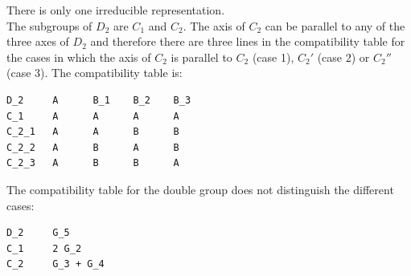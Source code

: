 \documentclass[12pt,a4paper]{article}
\begin{document}
There is only one irreducible representation. \\
The subgroups of $D_2$ are $C_1$ and $C_2$. The axis of $C_2$ can be parallel to
any of the three axes of $D_2$ and therefore there are three lines in the
compatibility table for the cases in which the axis of $C_2$ is parallel to 
$C_2$ (case 1), $C_2'$ (case 2) or $C_2''$ (case 3). 
The compatibility table is:
\begin{verbatim}
D_2     A      B_1    B_2    B_3  
C_1     A      A      A      A   
C_2_1   A      A      B      B     
C_2_2   A      B      A      B   
C_2_3   A      B      B      A
\end{verbatim}
The compatibility table for the double group does not distinguish the different
cases:
\begin{verbatim}
D_2     G_5  
C_1     2 G_2
C_2     G_3 + G_4
\end{verbatim}
\end{document}
